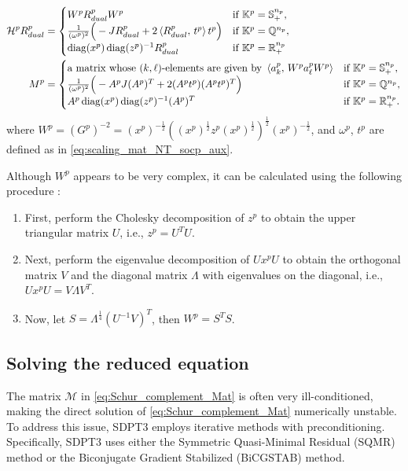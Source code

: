 \begin{align}
    \mathcal{H}^p R^p_{dual} &= \begin{cases}
        W^p R^p_{dual} W^p & \text{if } \mathbb{K}^p = \mathbb{S}^{n_p}_+, \\
        \frac{1}{(\omega^p)^2} \Big(-J R^p_{dual} + 2\left\langle R^p_{dual}, \, t^p \right\rangle t^p\Big) & \text{if } \mathbb{K}^p = \mathbb{Q}^{n_p},\\
        \operatorname{diag}(x^p) \operatorname{diag}(z^p)^{-1} R^p_{dual} & \text{if } \mathbb{K}^p = \mathbb{R}^{n_p}_+
    \end{cases}\\
    M^p &= \begin{cases}
        \text{a matrix whose $(k,\ell)$-elements are given by } \left\langle a^p_k, \, W^p a^p_\ell W^p \right\rangle & \text{if } \mathbb{K}^p = \mathbb{S}^{n_p}_+,\\
        \frac{1}{(\omega^p)^2}\Big(-A^p J (A^p)^T + 2 (A^p t^p)(A^p t^p)^T \Big) & \text{if } \mathbb{K}^p = \mathbb{Q}^{n_p}, \\
        A^p \operatorname{diag}(x^p) \operatorname{diag}(z^p)^{-1} (A^p)^T & \text{if } \mathbb{K}^p = \mathbb{R}^{n_p}_+.
    \end{cases} \label{eq:NT_M}
\end{align}
where $W^p = (G^p)^{-2} = (x^p)^{-\frac{1}{2}}((x^p)^{\frac{1}{2}} z^p (x^p)^{\frac{1}{2}})^{\frac{1}{2}} (x^p)^{-\frac{1}{2}}$, and $\omega^p$, $t^p$ are defined as in \eqref{eq:scaling_mat_NT_socp_aux}.

Although $W^p$ appears to be very complex, it can be calculated using the following procedure \cite{todd1998}:
\begin{enumerate}
    \item First, perform the Cholesky decomposition of $z^p$ to obtain the upper triangular matrix $U$, i.e., $z^p=U^TU$.
    \item Next, perform the eigenvalue decomposition of $U x^p U$ to obtain the orthogonal matrix $V$ and the diagonal matrix $\Lambda$ with eigenvalues on the diagonal, i.e., $U x^p U = V \Lambda V^T$.
    \item Now, let $S=\Lambda^\frac{1}{4}(U^{-1}V)^T$, then $W^p=S^T S$.
\end{enumerate}


\subsection{Solving the reduced equation} \label{sec:solve_reduced_eq}
The matrix $\mathcal{M}$ in \eqref{eq:Schur_complement_Mat} is often very ill-conditioned, making the direct solution of \eqref{eq:Schur_complement_Mat} numerically unstable. 
To address this issue, SDPT3 employs iterative methods with preconditioning. 
Specifically, SDPT3 \cite{toh1999} uses either the Symmetric Quasi-Minimal Residual (SQMR) method \cite{Freund1994} or the Biconjugate Gradient Stabilized (BiCGSTAB) method.

